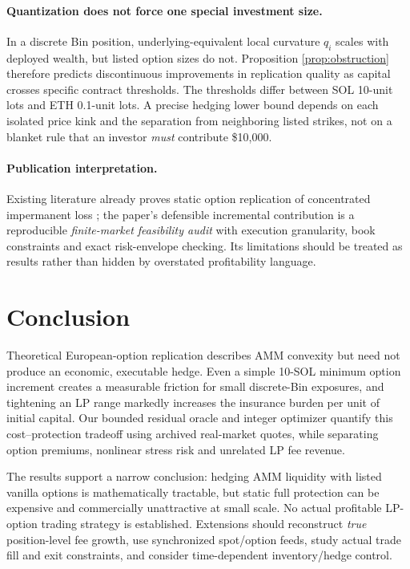 \paragraph{Quantization does not force one special investment size.}
In a discrete Bin position, underlying-equivalent local curvature $q_i$ scales with deployed wealth, but listed option sizes do not. Proposition \ref{prop:obstruction} therefore predicts discontinuous improvements in replication quality as capital crosses specific contract thresholds. The thresholds differ between SOL 10-unit lots and ETH 0.1-unit lots. A precise hedging lower bound depends on each isolated price kink and the separation from neighboring listed strikes, not on a blanket rule that an investor \emph{must} contribute \$10,000.

\paragraph{Publication interpretation.}
Existing literature already proves static option replication of concentrated impermanent loss \cite{deng2023static}; the paper's defensible incremental contribution is a reproducible \emph{finite-market feasibility audit} with execution granularity, book constraints and exact risk-envelope checking. Its limitations should be treated as results rather than hidden by overstated profitability language.

\section{Conclusion}
Theoretical European-option replication describes AMM convexity but need not produce an economic, executable hedge. Even a simple 10-SOL minimum option increment creates a measurable friction for small discrete-Bin exposures, and tightening an LP range markedly increases the insurance burden per unit of initial capital. Our bounded residual oracle and integer optimizer quantify this cost--protection tradeoff using archived real-market quotes, while separating option premiums, nonlinear stress risk and unrelated LP fee revenue.

The results support a narrow conclusion: hedging AMM liquidity with listed vanilla options is mathematically tractable, but static full protection can be expensive and commercially unattractive at small scale. No actual profitable LP-option trading strategy is established. Extensions should reconstruct \emph{true} position-level fee growth, use synchronized spot/option feeds, study actual trade fill and exit constraints, and consider time-dependent inventory/hedge control.

